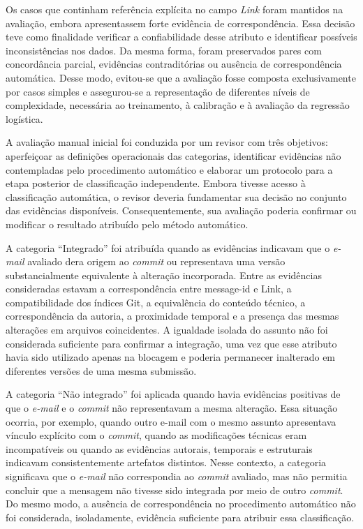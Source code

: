 Os casos que continham referência explícita no campo \textit{Link} foram mantidos na avaliação, embora apresentassem forte evidência de correspondência. Essa decisão teve como finalidade verificar a confiabilidade desse atributo e identificar possíveis inconsistências nos dados. Da mesma forma, foram preservados pares com concordância parcial, evidências contraditórias ou ausência de correspondência automática. Desse modo, evitou-se que a avaliação fosse composta exclusivamente por casos simples e assegurou-se a representação de diferentes níveis de complexidade, necessária ao treinamento, à calibração e à avaliação da regressão logística.

A avaliação manual inicial foi conduzida por um revisor com três objetivos: aperfeiçoar as definições operacionais das categorias, identificar evidências não contempladas pelo procedimento automático e elaborar um protocolo para a etapa posterior de classificação independente. Embora tivesse acesso à classificação automática, o revisor deveria fundamentar sua decisão no conjunto das evidências disponíveis. Consequentemente, sua avaliação poderia confirmar ou modificar o resultado atribuído pelo método automático. 

A categoria ``Integrado” foi atribuída quando as evidências indicavam que o \textit{e-mail} avaliado dera origem ao \textit{commit} ou representava uma versão substancialmente equivalente à alteração incorporada. Entre as evidências consideradas estavam a correspondência entre message-id e Link, a compatibilidade dos índices Git, a equivalência do conteúdo técnico, a correspondência da autoria, a proximidade temporal e a presença das mesmas alterações em arquivos coincidentes. A igualdade isolada do assunto não foi considerada suficiente para confirmar a integração, uma vez que esse atributo havia sido utilizado apenas na blocagem e poderia permanecer inalterado em diferentes versões de uma mesma submissão. 

A categoria ``Não integrado” foi aplicada quando havia evidências positivas de que o \textit{e-mail} e o \textit{commit} não representavam a mesma alteração. Essa situação ocorria, por exemplo, quando outro e-mail com o mesmo assunto apresentava vínculo explícito com o \textit{commit}, quando as modificações técnicas eram incompatíveis ou quando as evidências autorais, temporais e estruturais indicavam consistentemente artefatos distintos. Nesse contexto, a categoria significava que o \textit{e-mail} não correspondia ao \textit{commit} avaliado, mas não permitia concluir que a mensagem não tivesse sido integrada por meio de outro \textit{commit}. Do mesmo modo, a ausência de correspondência no procedimento automático não foi considerada, isoladamente, evidência suficiente para atribuir essa classificação. 

